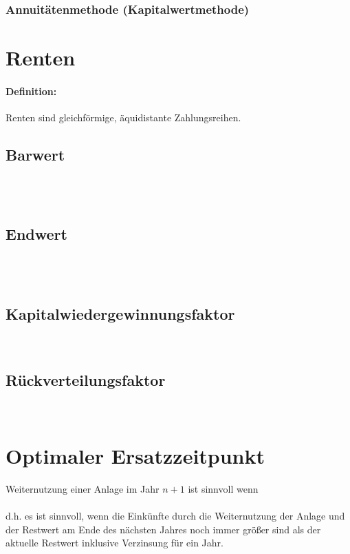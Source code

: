 \clearpage
\subsubsection{Annuitätenmethode (Kapitalwertmethode)}

\clearpage
\section{Renten}
\paragraph{Definition:} Renten sind gleichförmige,
äquidistante Zahlungsreihen.

\clearpage
\subsection{Barwert}
\\
\\

\clearpage
\subsection{Endwert}
\\
\\


\clearpage
\subsection{Kapitalwiedergewinnungsfaktor}
\\

\clearpage
\subsection{Rückverteilungsfaktor}
\\

\clearpage
\section{Optimaler Ersatzzeitpunkt}
Weiternutzung einer Anlage im Jahr $n+1$ ist sinnvoll wenn\\
\\
d.h. es ist sinnvoll, wenn die Einkünfte durch die Weiternutzung der Anlage und der Restwert am Ende des nächsten Jahres noch immer größer sind als der aktuelle Restwert inklusive Verzinsung für ein Jahr.

